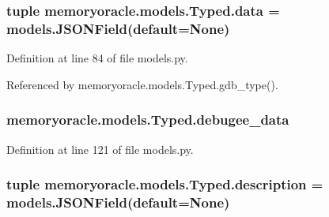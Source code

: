\hypertarget{classmemoryoracle_1_1models_1_1Typed_ab61ec9770a4fbd9d29207b242b31c488}{}
\subsubsection[{data}]{\setlength{\rightskip}{0pt plus 5cm}tuple memoryoracle.\+models.\+Typed.\+data = models.\+J\+S\+O\+N\+Field(default=None)\hspace{0.3cm}{\ttfamily [static]}}\label{classmemoryoracle_1_1models_1_1Typed_ab61ec9770a4fbd9d29207b242b31c488}


Definition at line 84 of file models.\+py.



Referenced by memoryoracle.\+models.\+Typed.\+gdb\+\_\+type().

\hypertarget{classmemoryoracle_1_1models_1_1Typed_a40d8be4b649e217afdf20f4856d10b30}{}
\subsubsection[{debugee\+\_\+data}]{\setlength{\rightskip}{0pt plus 5cm}memoryoracle.\+models.\+Typed.\+debugee\+\_\+data}\label{classmemoryoracle_1_1models_1_1Typed_a40d8be4b649e217afdf20f4856d10b30}


Definition at line 121 of file models.\+py.

\hypertarget{classmemoryoracle_1_1models_1_1Typed_a786391a15a2ed55cd5e3cbf5c042f34c}{}
\subsubsection[{description}]{\setlength{\rightskip}{0pt plus 5cm}tuple memoryoracle.\+models.\+Typed.\+description = models.\+J\+S\+O\+N\+Field(default=None)\hspace{0.3cm}{\ttfamily [static]}}\label{classmemoryoracle_1_1models_1_1Typed_a786391a15a2ed55cd5e3cbf5c042f34c}


